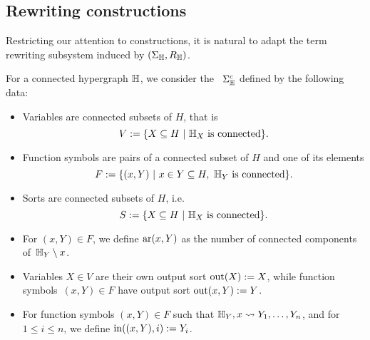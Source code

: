




\subsection{Rewriting constructions}

Restricting our attention to constructions, it is natural to adapt the term rewriting subsystem induced by $(\Sigma_{\mathbb H},R_{\mathbb H})$.

\begin{definition}
  For a connected hypergraph ${\mathbb H}$, we consider the ~$\Sigma_{\mathbb H}^c$ defined by the following data:
  \begin{itemize}
    \item Variables are connected subsets of $H$, that is $$V:=\{ X \subseteq H \ | \ \hyper{H}_{X} \text{ is connected}\}.$$ 
    \item Function symbols are pairs of a connected subset of $H$ and one of its elements 
    $$F:=\{(x,Y) \ | \ x \in Y \subseteq H, \ {\mathbb H}_Y \text{ is connected}\}.$$
    \item Sorts are connected subsets of $H$, i.e. 
    $$S:=\{ X \subseteq H \ | \ {\mathbb H}_X \text{ is connected}\}.$$
    \item For $(x,Y) \in F$, we define $\mathrm{ar}(x,Y)$ as the number of connected components of~${\mathbb H}_Y\setminus {x}$.
    \item Variables $X \in V$ are their own output sort $\operatorname{out}(X):=X$, while function symbols~$(x,Y) \in F$ have output sort $\operatorname{out}(x,Y):=Y$.
    \item For function symbols $(x,Y) \in F$ such that ${\mathbb H}_Y,x \leadsto Y_1,\ldots,Y_n$, and for $1 \leq i \leq n$, we define $\operatorname{in}((x,Y),i):=Y_i$.
  \end{itemize}
\end{definition}

